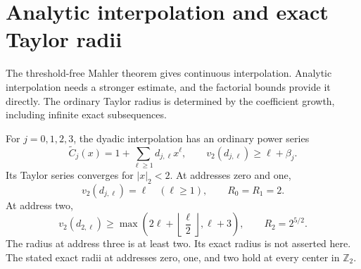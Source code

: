 \section{Analytic interpolation and exact Taylor radii}
\label{sec:analytic-radii-final}

The threshold-free Mahler theorem gives continuous interpolation.
Analytic interpolation needs a stronger estimate, and the factorial
bounds provide it directly. The ordinary Taylor radius is determined
by the coefficient growth, including infinite exact subsequences.

\begin{theorem}
\label{thm:four-taylor-radii}
For $j=0,1,2,3$, the dyadic interpolation has an ordinary power series
\[
 \widetilde C_j(x)=1+\sum_{\ell\geq1}d_{j,\ell}x^\ell,
 \qquad v_2(d_{j,\ell})\geq\ell+\beta_j.
\]
Its Taylor series converges for $|x|_2<2$.
At addresses zero and one,
\begin{equation}
 v_2(d_{j,\ell})=\ell\quad(\ell\geq1),
 \qquad R_0=R_1=2.
 \label{eq:zero-one-exact-taylor-radius}
\end{equation}
At address two,
\begin{equation}
 v_2(d_{2,\ell})\geq
       \max\left(2\ell+\left\lfloor\frac\ell2\right\rfloor,
                          \ell+3\right),
 \qquad R_2=2^{5/2}.
 \label{eq:two-exact-taylor-radius}
\end{equation}
The radius at address three is at least two. Its exact radius is not
asserted here. The stated exact radii at addresses zero, one, and two
hold at every center in $\mathbb Z_2$.
\end{theorem}


